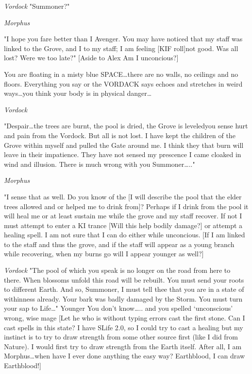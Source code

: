 {\em Vordock}
"Summoner?"

{\em Morphus}

"I hope you fare better than I Avenger. You may have noticed 
that my staff was linked to the Grove, and I to my staff; I am feeling 
[KIF roll]{not good}. Was all lost? Were we too late?"
[Aside to Alex Am I unconcious?]

You are floating in a misty blue SPACE\dots there are no walls, no 
ceilings and no floors. Everything you say or the VORDACK says 
echoes and stretches in weird ways\dots you think your body is 
in physical danger\dots 

{\em Vordock}		

"Despair\dots the trees are burnt, the pool is dried, 
the Grove is leveled{you sense hurt and pain from the Vordock}. But 
all is not lost. I have kept the children of the Grove within myself 
and pulled the Gate around me. I think they that burn will leave in 
their impatience. They have not sensed my prescence I came cloaked in 
wind and illusion. There is much wrong with you Summoner\dots.."

{\em Morphus}
			
"I sense that as well. Do you know of the [I will describe the 
pool that the elder trees allowed and or helped me to drink from]? 
Perhaps if I drink from the pool it will heal me or at least sustain me 
while the grove and my staff recover. If not I must attempt to enter a 
KI trance [Will this help bodily damage?] or attempt a healing spell. I 
am not sure that I can do either while unconcious.
[If I am linked to the staff and thus the grove, and if the staff will 
appear as a young branch while recovering, when my burns go will I 
appear younger as well?]

{\em Vordock}
"The pool of which you speak is no longer on the road from
here to there. When blossoms unfold this road will be rebuilt. You must 
send your roots to different Earth. And so, Summoner, I must tell thee 
that you are in a state of within\-ness already. Your bark was badly 
damaged by the Storm. You must turn your sap to Life\dots "
{Younger You don't know\dots.. and you spelled `unconscious' wrong, wise mage}
[Let he who is without typing errors cast the first stone.
Can I cast spells in this state? I have SLife 2.0, so I could try to 
cast a healing but my instinct is to try to draw strength from some 
other source first (like I did from Nature). I would first try to draw 
strength from the Earth itself. After all, I am Morphus\dots when have I 
ever done anything the easy way? Earthblood, I can draw Earthblood!]

